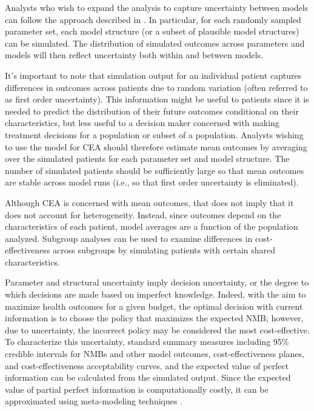 \documentclass[11pt,final,fleqn]{article}\usepackage[]{graphicx}\usepackage[]{color}
\theoremstyle{plain}
\begin{document}
Analysts who wish to expand the analysis to capture uncertainty between models can follow the approach described in \citet{bojke2009characterizing}. In particular, for each randomly sampled parameter set, each model structure (or a subset of plausible model structures) can be simulated. The distribution of simulated outcomes across parameters and models will then reflect uncertainty both within and between models. 

It's important to note that simulation output for an individual patient captures differences in outcomes across patients due to random variation (often referred to as first order uncertainty). This information might be useful to patients since it is needed to predict the distribution of their future outcomes conditional on their characteristics, but less useful to a decision maker concerned with making treatment decisions for a population or subset of a population. Analysts wishing to use the model for CEA should therefore estimate mean outcomes by averaging over the simulated patients for each parameter set and model structure. The number of simulated patients should be sufficiently large so that mean outcomes are stable across model runs (i.e., so that first order uncertainty is eliminated). 

Although CEA is concerned with mean outcomes, that does not imply that it does not account for heterogeneity. Instead, since outcomes depend on the characteristics of each patient, model averages are a function of the population analyzed. Subgroup analyses can be used to examine differences in cost-effectiveness across subgroups by simulating patients with certain shared characteristics. 

Parameter and structural uncertainty imply decision uncertainty, or the degree to which decisions are made based on imperfect knowledge. Indeed, with the aim to maximize health outcomes for a given budget, the optimal decision with current information is to choose the policy that maximizes the expected NMB; however, due to uncertainty, the incorrect policy may be considered the most cost-effective. To characterize this uncertainty, standard summary measures including 95\% credible intervals for NMBs and other model outcomes, cost-effectiveness planes, and cost-effectiveness acceptability curves, and the expected value of perfect information can be calculated from the simulated output. Since the expected value of partial perfect information is computationally costly, it can be approximated using meta-modeling techniques \citep{jalal2013linear, jalal2015computing, heath2016estimating}.
\end{document}

